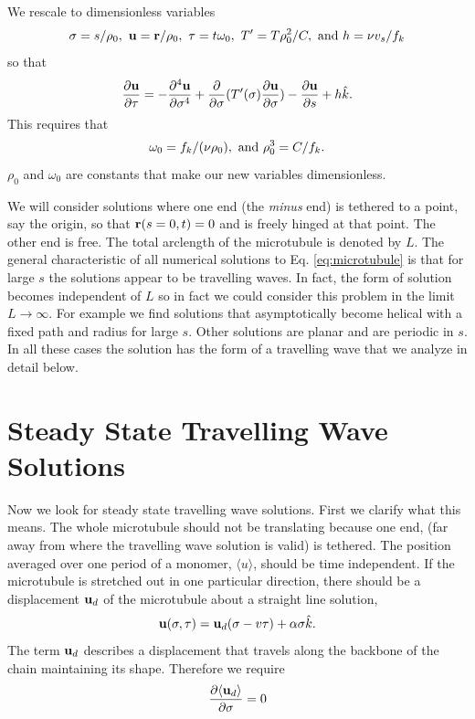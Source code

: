\documentclass[pre,showpacs]{revtex4}
\def\br{{\bf r}}
\def\bu{{\bf u}}
\begin{document}
We rescale to dimensionless variables 
\begin{equation}
\label{eq:rescale}
\sigma = s/\rho_0,~ \bu = \br/\rho_0, ~ \tau = t \omega_0,  ~ T' = T \rho_0^2/C, ~{\rm and} ~ h = \nu v_s/f_k 
\end{equation}
so that
\begin{equation}
\label{eq:dimensionless}
\frac{\partial \bu}{\partial \tau} =  - \frac{\partial^4 \bu}{\partial \sigma^4} + \frac{\partial}{\partial \sigma}(T'(\sigma)\frac{\partial \bu}{\partial \sigma}) -
\frac{\partial \bu}{\partial s} + h {\hat k} .
\end{equation}
This requires that 
\begin{equation}
\label{eq:scaling}
\omega_0 = f_k/(\nu \rho_0), ~  {\rm and} ~ \rho_0^3 = C/f_k. 
\end{equation}
$\rho_0$ and $\omega_0$ are constants that make our new variables dimensionless.

We will consider solutions where one end (the {\em minus} end) is tethered to a point, say the origin, so that
$\br(s=0,t) = 0$ and is freely hinged at that point. The other end is free.
The total arclength of the microtubule is denoted by $L$.
The general characteristic of all numerical solutions to Eq. \ref{eq:microtubule} is that
for large $s$ the solutions appear to be travelling waves. In fact, the form of solution
becomes independent of $L$ so in fact we could consider this problem in the limit $L\rightarrow \infty$.
For example we find solutions that asymptotically become helical with a fixed path and radius for
large $s$. Other solutions are planar and are periodic in $s$. In all these cases the solution
has the form of a travelling wave that we analyze in detail below.

\section{Steady State Travelling Wave Solutions}

Now we look for steady state travelling wave solutions. First we clarify what this means.
The whole microtubule should not be translating because one end, (far away from where
the travelling wave solution is valid) is tethered. 
The position averaged over one period of a monomer, $\langle u \rangle$, should be  time independent.
If the microtubule is stretched out
in one particular direction, there should be a displacement $\bu_d$ of the microtubule about a straight
line solution,
\begin{equation}
\label{eq:travelling}
\bu(\sigma, \tau) = \bu_d(\sigma-v\tau) + \alpha \sigma {\hat k}.
\end{equation}
The term $\bu_d$ describes a displacement that travels along the backbone of the chain maintaining its shape.
Therefore we require
\begin{equation}
\label{eq:ud_constraint}
\frac{\partial \langle \bu_d \rangle}{\partial \sigma} = 0
\end{equation}
\end{document}
